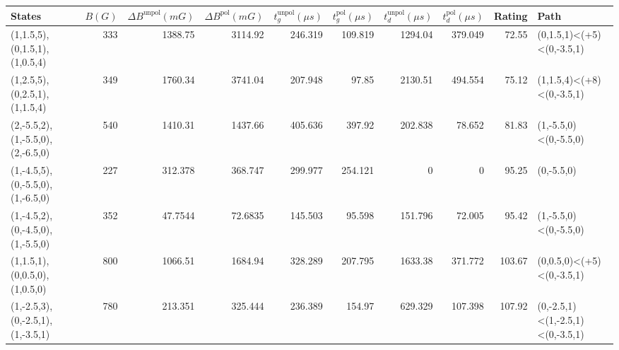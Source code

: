 \begin{tabular}{lrrrrrrrrl}
\hline
 {States}                         &   {$B(G)$} &   {$\Delta B^{\text{unpol}}(mG)$} &   {$\Delta B^{\text{pol}}(mG)$} &   {$t^{\text{unpol}}_{g}(\mu s)$} &   {$t^{\text{pol}}_{g}(\mu s)$} &   {$t^{\text{unpol}}_{d}(\mu s)$} &   {$t^{\text{pol}}_{d}(\mu s)$} &   {Rating} & {Path}                           \\
\hline
 (1,1.5,5),(0,1.5,1),(1,0.5,4)    &        333 &                         1388.75   &                       3114.92   &                           246.319 &                         109.819 &                          1294.04  &                         379.049 &      72.55 & (0,1.5,1)<(+5)<(0,-3.5,1)        \\
 (1,2.5,5),(0,2.5,1),(1,1.5,4)    &        349 &                         1760.34   &                       3741.04   &                           207.948 &                          97.85  &                          2130.51  &                         494.554 &      75.12 & (1,1.5,4)<(+8)<(0,-3.5,1)        \\
 (2,-5.5,2),(1,-5.5,0),(2,-6.5,0) &        540 &                         1410.31   &                       1437.66   &                           405.636 &                         397.92  &                           202.838 &                          78.652 &      81.83 & (1,-5.5,0)<(0,-5.5,0)            \\
 (1,-4.5,5),(0,-5.5,0),(1,-6.5,0) &        227 &                          312.378  &                        368.747  &                           299.977 &                         254.121 &                             0     &                           0     &      95.25 & (0,-5.5,0)                       \\
 (1,-4.5,2),(0,-4.5,0),(1,-5.5,0) &        352 &                           47.7544 &                         72.6835 &                           145.503 &                          95.598 &                           151.796 &                          72.005 &      95.42 & (1,-5.5,0)<(0,-5.5,0)            \\
 (1,1.5,1),(0,0.5,0),(1,0.5,0)    &        800 &                         1066.51   &                       1684.94   &                           328.289 &                         207.795 &                          1633.38  &                         371.772 &     103.67 & (0,0.5,0)<(+5)<(0,-3.5,1)        \\
 (1,-2.5,3),(0,-2.5,1),(1,-3.5,1) &        780 &                          213.351  &                        325.444  &                           236.389 &                         154.97  &                           629.329 &                         107.398 &     107.92 & (0,-2.5,1)<(1,-2.5,1)<(0,-3.5,1) \\

\end{tabular}
